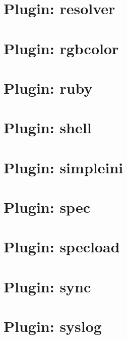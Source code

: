 \let\mypdfximage\pdfximage\def\pdfximage{\immediate\mypdfximage}\documentclass[twoside]{book}
\newcommand{\+}{\discretionary{\mbox{\scriptsize$\hookleftarrow$}}{}{}}
\begin{document}
\chapter{Plugin\+: resolver}
\label{md_src_plugins_resolver_README}

\chapter{Plugin\+: rgbcolor}
\label{md_src_plugins_rgbcolor_README}

\chapter{Plugin\+: ruby}
\label{md_src_plugins_ruby_README}

\chapter{Plugin\+: shell}
\label{md_src_plugins_shell_README}

\chapter{Plugin\+: simpleini}
\label{md_src_plugins_simpleini_README}

\chapter{Plugin\+: spec}
\label{md_src_plugins_spec_README}

\chapter{Plugin\+: specload}
\label{md_src_plugins_specload_README}

\chapter{Plugin\+: sync}
\label{md_src_plugins_sync_README}

\chapter{Plugin\+: syslog}
\label{md_src_plugins_syslog_README}

\end{document}
